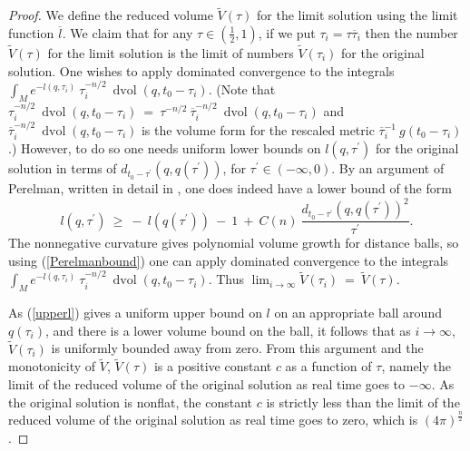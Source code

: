 \documentclass[12pt]{amsart}
\newcommand{\dvol}{\operatorname{dvol}}
\numberwithin{equation}{section}
\theoremstyle{plain}
\theoremstyle{definition}
\theoremstyle{remark}
\begin{document}
\begin{proof}
We define the reduced volume $\tilde{V}(\tau)$ for the limit solution
using the limit function $\overline{l}$. 
We claim that for any 
$\tau \in \left( \frac12, 1 \right)$, if we put $\tau_i = \tau \overline{\tau}_i$
then the number $\tilde{V}(\tau)$ for
the limit solution is the limit of numbers $\tilde{V}(\tau_i)$ for the
original solution. One wishes to apply dominated convergence to the
integrals $\int_M e^{-l(q, \tau_i)} \: 
\tau_i^{-n/2} \: \dvol(q,t_0 - \tau_i)$. 
(Note that $\tau_i^{-n/2} \: \dvol(q,t_0 - \tau_i) \: = \:
\tau^{-n/2} \: \overline{\tau}_i^{-n/2} \: \dvol(q,t_0 - \tau_i)$ and
$\overline{\tau}_i^{-n/2} \: \dvol(q,t_0 - \tau_i)$ is the volume form for the
rescaled metric $\overline{\tau}_i^{-1} \: g(t_0 - \tau_i)$.)
However, to do so one needs uniform lower bounds on
$l(q, \tau^\prime)$ for the original solution in terms of 
$d_{t_0-\tau^\prime}(q, q(\tau^\prime))$, for $\tau^\prime \in (-\infty, 0)$. 
By an argument of Perelman,
written in detail in \cite{Ye1}, one does indeed have a lower bound of the
form
\begin{equation} \label{Perelmanbound}
l(q, \tau^\prime) \: \ge \: - \: l(q(\tau^\prime)) \: - \: 1 \: + \: C(n) \:
\frac{d_{t_0-\tau^\prime}(q, q(\tau^\prime))^2}{\tau^\prime}.
\end{equation}
The nonnegative curvature gives polynomial volume growth for 
distance balls,
so using (\ref{Perelmanbound}) 
one can apply dominated convergence to the integrals
$\int_M e^{-l(q, \tau_i)} \: 
\tau_i^{-n/2} \: \dvol(q,t_0 - \tau_i)$.
Thus $\lim_{i \rightarrow \infty} \tilde{V}(\tau_i) \: = \: 
\tilde{V}(\tau)$.

As (\ref{upperl}) gives
a uniform upper bound on $l$ on an appropriate 
ball around $q(\tau_i)$, and there is a lower 
volume bound on the ball, it follows that as $i \rightarrow \infty$,
$\tilde{V}(\tau_i)$ is uniformly bounded away from zero. From this
argument and the monotonicity of $\tilde{V}$, 
$\tilde{V}(\tau)$ is a positive constant $c$ as a function of
$\tau$, namely the limit of the reduced volume of the original
solution as real time goes to $- \infty$. As the original solution is
nonflat, the constant $c$ is strictly less than the limit of the
reduced volume of the original solution
as real time goes to zero, which is $(4 \pi)^{\frac{n}{2}}$. 


\end{proof}
\end{document}
